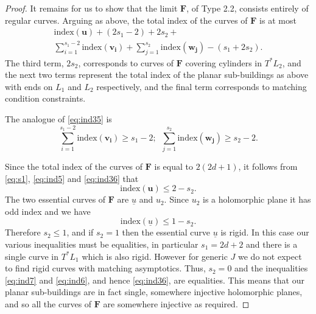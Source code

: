 \documentclass[12pt]{amsart}
\theoremstyle{definition}
\begin{document}
\begin{proof}
\medskip

It remains for us to show that the limit $\mathbf{F}$, of Type 2.2, consists entirely of regular curves.  Arguing as above, the total index of the curves of $\mathbf{F}$ is at most \begin{equation}\label{eq:ind5}
\begin{split}
   \mathrm{index}(\mathbf{u}) + (2s_1-2) + 2s_2 + \\
   \sum_{i=1}^{s_1-2}\mathrm{index}(\mathbf{v_i}) + \sum_{j=1}^{s_2}\mathrm{index}(\mathbf{w_j}) - (s_1 + 2s_2). 
\end{split}
\end{equation} 
The third term, $2s_2$, corresponds to curves of $\mathbf{F}$ covering cylinders in $T^*L_2$, and the next two terms represent the total index of the planar sub-buildings as above with ends on $L_1$ and $L_2$ respectively, and the  
final term corresponds to matching condition constraints.

The analogue of \eqref{eq:ind35} is
\begin{equation}\label{eq:ind36}
   \sum_{i=1}^{s_1-2}\mathrm{index}(\mathbf{v_i}) \geq s_1 -2; \, \, \,  \sum_{j=1}^{s_2}\mathrm{index}(\mathbf{w_j}) \geq s_2 -2.
\end{equation}

Since the total index of the curves of $\mathbf{F}$ is equal to $2(2d+1)$, it follows from \eqref{eq:s1}, \eqref{eq:ind5} and \eqref{eq:ind36}  that 
\begin{equation}\label{eq:ind7}
   \mathrm{index}(\mathbf{u}) \leq 2-s_2. 
\end{equation}
The two essential curves of $\mathbf{F}$ are $\underline{u}$ and $u_2$. Since  $u_2$ is a holomorphic plane it has odd index and we have \begin{equation}\label{eq:ind6}
   \mathrm{index}(\underline{u}) \leq 1-s_2. 
\end{equation} 
Therefore $s_2  \le 1$, and if $s_2=1$ then the essential curve $\underline{u}$ is rigid. In this case our various inequalities must be equalities, in particular $s_1=2d+2$ and there is a single curve in $T^*L_1$ which is also rigid. However for generic $J$ we do not expect to find rigid curves with matching asymptotics. 
Thus, $s_2 =0$ and the inequalities \eqref{eq:ind7} and \eqref{eq:ind6}, and hence \eqref{eq:ind36}, are equalities. This means that our planar sub-buildings are in fact single, somewhere injective holomorphic planes, and so all the curves of $\mathbf{F}$ are somewhere injective as required.



\end{proof}
\end{document}
